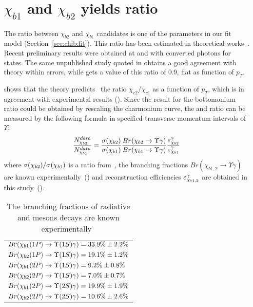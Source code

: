 \section{\texorpdfstring{$\chi_{b1}$}{chib1} and \texorpdfstring{$\chi_{b2}$}{chib2} yields ratio}
\label{sec:ratio}

The ratio between $\chi_{b2}$ and $\chi_{b1}$ candidates is one of the
parameters in our fit model (Section~\ref{sec:chib:fit}). This ratio has been
estimated in theoretical works~\cite{Likhoded:2012hw}. Recent preliminary
results were obtained at \lhcb and \cms with converted photons for \chibOneP
states. The same unpublished \lhcb study quoted in 
obtains a good agreement with theory within errors, while \cms\cite{CMS-PAS-BPH-13-005}
gets a value of this ratio of 0.9, flat as function of $p_T$.

 shows that the theory
predicts~\cite{Likhoded:2012hw} the ratio $\chi_{c2}/\chi_{c1}$ as a function
of $p_T$, which is in agreement with experimental results ().
Since the result for the bottomonium ratio could be obtained by rescaling the
charmonium curve, the  \chibone and \chibtwo ratio can be  measured by the
following formula in specified transverse momentum intervals of $\Upsilon$:
\begin{equation}
    \frac{N_{\chi_{{b} 2}}^{data}}{N_{\chi_{{b} 1}}^{data}} = \frac{\sigma(\chi_{{b} 2})}{\sigma(\chi_{{b} 1})}
    \frac{Br(\chi_{{b} 2}\rightarrow\Upsilon\gamma)}{Br(\chi_{{b} 1}\rightarrow\Upsilon\gamma)}\frac{{\varepsilon}_{\chi_{{b} 2}}^{\gamma}}{{\varepsilon}_{\chi_{{b} 1}}^{\gamma}}
\label{eqn:mc_ratio}
\end{equation}
\noindent where $\sigma(\chi_{{b} 2}) / \sigma(\chi_{{b} 1})$ is a ratio
from~\cite{Likhoded:2012hw}, the branching fractions $Br(\chi_{b1,2} \to \Upsilon \gamma)$ 
are known experimentally~() and reconstruction efficiencies 
${\varepsilon}_{\chi_{b1,2}}^{\gamma}$ are obtained in this study~().

\begin{table}[H]
\caption{The branching fractions of radiative \chibOneP and \chibTwoP mesons
decays are known experimentally~\cite{PDG2012}}
\centering
\begin{tabular}{l}
$Br(\chiboneOneP \to \Y1S \gamma) = 33.9\% \pm 2.2\%$ \\
$Br(\chibtwoOneP \to \Y1S \gamma) = 19.1\% \pm 1.2\%$ \\
$Br(\chiboneTwoP \to \Y1S \gamma) = 9.2\% \pm 0.8\%$ \\
$Br(\chibtwoTwoP \to \Y1S \gamma)  = 7.0\% \pm 0.7\%$ \\
$Br(\chiboneTwoP \to \Y2S \gamma) = 19.9\% \pm 1.9\%$ \\
$Br(\chibtwoTwoP \to \Y2S \gamma) = 10.6\% \pm 2.6\%$ \\
\end{tabular}
\label{tab:branching}
\end{table}

